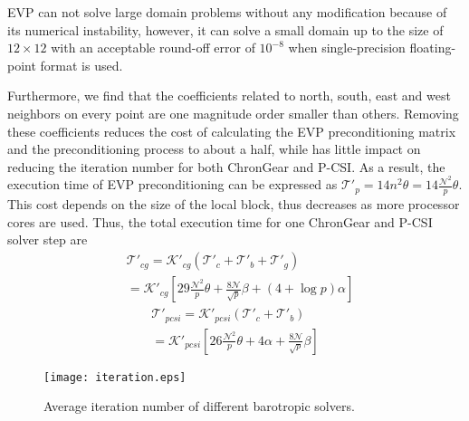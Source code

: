 EVP can not solve large domain problems without any modification because of its numerical instability, however, it can 
solve a small domain up to the size of $12\times 12$ with an acceptable round-off error of $10^{-8}$ when single-precision floating-point format is used. %

Furthermore, we find that the coefficients related to north, south, east and west neighbors on every point are one magnitude order smaller than others. 
Removing these coefficients reduces the cost of calculating the EVP preconditioning matrix and the preconditioning process to about a half,
while has little impact on reducing the iteration number for both ChronGear and P-CSI. 
As a result, the execution time of EVP preconditioning can be expressed as $\mathcal{T'}_{p} = 14n^2\theta= 14\frac{\mathcal{N}^2}{p}\theta$. 
This cost depends on the size of the local block, thus decreases as more processor cores are used.
Thus, the total execution time for one ChronGear and P-CSI solver step are 
\begin{eqnarray}
\label{t_evppcg}
&\mathcal{T'}_{cg}=\mathcal{K'}_{cg} (\mathcal{T'}_c + \mathcal{T'}_b+\mathcal{T'}_g )\nonumber \\
&=\mathcal{K'}_{cg} [29 \frac{\mathcal{N}^2}{p}\theta + \frac{8\mathcal{N}}{\sqrt{p}}\beta +(4+\log p)\alpha]
\end{eqnarray}
\begin{eqnarray}
\label{t_evppsi}
\mathcal{T'}_{pcsi} = \mathcal{K'}_{pcsi}(\mathcal{T'}_c + \mathcal{T'}_b ) \nonumber \\
= \mathcal{K'}_{pcsi}[26\frac{\mathcal{N}^2}{p}\theta+ 4\alpha + \frac{8\mathcal{N}}{ \sqrt{p}}\beta]
\end{eqnarray}

\begin {figure}[!t]
\centering
\texttt{[image: iteration.eps]}
\caption[] {Average iteration number of different barotropic solvers. \label{fig:iteration}}
\end{figure}

